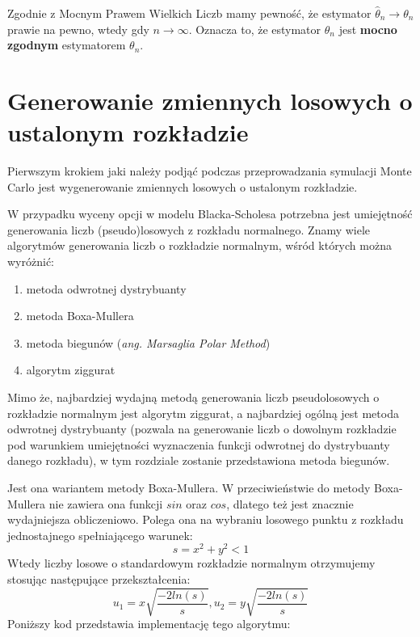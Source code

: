 \documentclass{pracamgr}
\begin{document}
Zgodnie z Mocnym Prawem Wielkich Liczb mamy pewność, że estymator $\hat{\theta}_n \rightarrow \theta_n$ prawie na pewno, wtedy gdy $n \rightarrow \infty$. Oznacza to, że estymator $\hat{\theta}_n $ jest \textbf{mocno zgodnym} estymatorem $\theta_n$.



\section{Generowanie zmiennych losowych o ustalonym rozkładzie}
\label{sec:genRV}

Pierwszym krokiem jaki należy podjąć podczas przeprowadzania symulacji Monte Carlo jest 
wygenerowanie zmiennych losowych o ustalonym rozkładzie.

W przypadku wyceny opcji w modelu Blacka-Scholesa potrzebna jest umiejętność generowania liczb (pseudo)losowych z rozkładu normalnego. Znamy wiele algorytmów generowania liczb o rozkładzie normalnym, wśród których można wyróżnić:
\begin{enumerate}
  \item metoda odwrotnej dystrybuanty
  \item metoda Boxa-Mullera
  \item metoda biegunów (\textit{ang. Marsaglia Polar Method}) \cite{Marsaglia}
  \item algorytm ziggurat
\end{enumerate}

Mimo że, najbardziej wydajną metodą generowania liczb pseudolosowych o rozkładzie normalnym jest algorytm ziggurat, a najbardziej ogólną jest metoda odwrotnej dystrybuanty (pozwala na generowanie liczb o dowolnym rozkładzie pod warunkiem umiejętności wyznaczenia funkcji odwrotnej do dystrybuanty danego rozkładu), w tym rozdziale zostanie przedstawiona metoda biegunów.

Jest ona wariantem metody Boxa-Mullera. W przeciwieństwie do metody 
Boxa-Mullera nie zawiera ona funkcji $sin$ oraz $cos$, dlatego też jest znacznie wydajniejsza obliczeniowo\cite{Korn}.
Polega ona na wybraniu losowego punktu z rozkładu jednostajnego spełniającego warunek:
\begin{equation}
  s = x^2 + y^2 < 1
\end{equation}
Wtedy liczby losowe o standardowym rozkładzie normalnym otrzymujemy stosując następujące przekształcenia:
\begin{equation}
  u_1 = x \sqrt{\frac{-2ln(s)}{s}}, u_2 = y \sqrt{\frac{-2ln(s)}{s}}
\end{equation}
Poniższy kod przedstawia implementację tego algorytmu:
\end{document}
